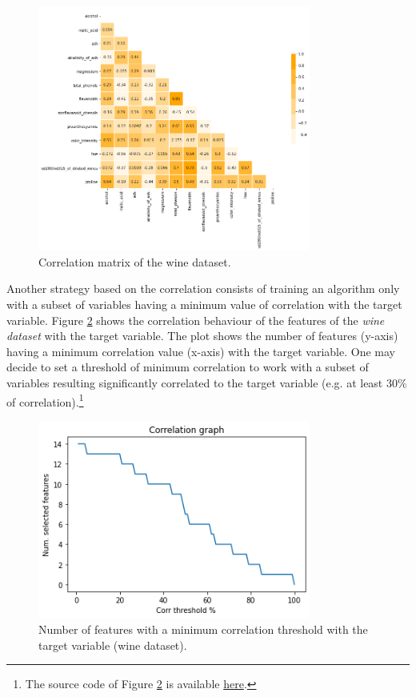 \begin{figure}[hbt!]
\centering
\includegraphics[width=0.8\textwidth]{SectionLetsMath/dimensionalityReduction_figures/fig_corrMatrix.png}
\captionsetup{type=table}
\caption{Correlation matrix of the wine dataset.}
\label{fig_corrMatrix}
\end{figure}

Another strategy based on the correlation consists of training an algorithm only with a subset of variables having a minimum value of correlation with the target variable. Figure \ref{fig_selectCorr} shows the correlation behaviour of the features of the \textit{wine dataset} with the target variable. The plot shows the number of features (y-axis) having a minimum correlation value (x-axis) with the target variable. One may decide to set a threshold of minimum correlation to work with a subset of variables resulting significantly correlated to the target variable (e.g. at least 30\% of correlation).\footnote{The source code of Figure \ref{fig_selectCorr} is available \href{https://github.com/aletuf93/logproj/blob/master/examples/05.\%20Dimensionality\%20Reduction.ipynb}{here}.}

\begin{figure}[hbt!]
\centering
\includegraphics[width=0.8\textwidth]{SectionLetsMath/dimensionalityReduction_figures/fig_selectCorr.png}
\captionsetup{type=table}
\caption{Number of features with a minimum correlation threshold with the target variable (wine dataset).}
\label{fig_selectCorr}
\end{figure}

